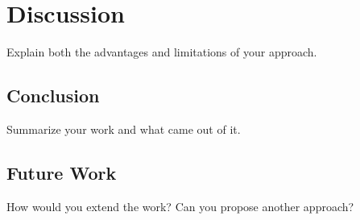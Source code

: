 \chapter{Discussion}\label{chap:discussion}

Explain both the advantages and limitations of your approach.

\section{Conclusion}\label{sec:conclusion}

Summarize your work and what came out of it.

\section{Future Work}\label{sec:future_work}

How would you extend the work? Can you propose another approach?